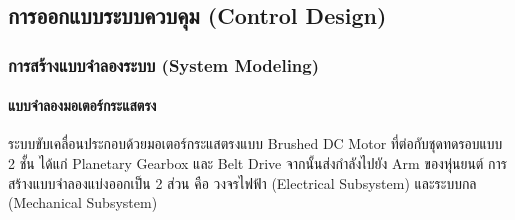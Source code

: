 %

\subsection{การออกแบบระบบควบคุม (Control Design)}
\label{subsec:control_design}

\subsubsection{การสร้างแบบจำลองระบบ (System Modeling)}
\label{subsubsec:system_modeling}

\paragraph{แบบจำลองมอเตอร์กระแสตรง}

ระบบขับเคลื่อนประกอบด้วยมอเตอร์กระแสตรงแบบ Brushed DC Motor
ที่ต่อกับชุดทดรอบแบบ 2 ชั้น ได้แก่ Planetary Gearbox และ Belt Drive
จากนั้นส่งกำลังไปยัง Arm ของหุ่นยนต์ การสร้างแบบจำลองแบ่งออกเป็น
2 ส่วน คือ วงจรไฟฟ้า (Electrical Subsystem) และระบบกล (Mechanical Subsystem)

